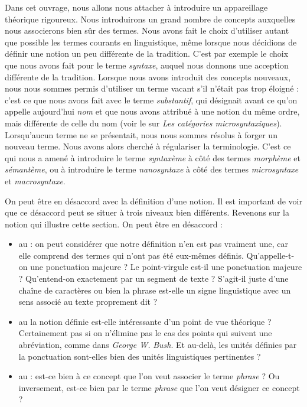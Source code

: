 {    Dans cet ouvrage, nous allons nous attacher à introduire un appareillage théorique rigoureux. Nous introduirons un grand nombre de concepts auxquelles nous associerons bien sûr des termes. Nous avons fait le choix d’utiliser autant que possible les termes courants en linguistique, même lorsque nous décidions de définir une notion un peu différente de la tradition. C’est par exemple le choix que nous avons fait pour le terme \textit{syntaxe}, auquel nous donnons une acception différente de la tradition. Lorsque nous avons introduit des concepts nouveaux, nous nous sommes permis d’utiliser un terme vacant s’il n’était pas trop éloigné : c’est ce que nous avons fait avec le terme \textit{substantif}, qui désignait avant ce qu’on appelle aujourd’hui \textit{nom} et que nous avons attribué à une notion du même ordre, mais différente de celle du nom (voir le  sur \textit{Les catégories microsyntaxiques}). Lorsqu’aucun terme ne se présentait, nous nous sommes résolus à forger un nouveau terme. Nous avons alors cherché à régulariser la terminologie. C’est ce qui nous a amené à introduire le terme \textit{syntaxème} à côté des termes \textit{morphème} et \textit{sémantème}, ou à introduire le terme \textit{nanosyntaxe} à côté des termes \textit{microsyntaxe} et \textit{macrosyntaxe}.

    On peut être en désaccord avec la définition d’une notion. Il est important de voir que ce désaccord peut se situer à trois niveaux bien différents. Revenons sur la notion qui illustre cette section. On peut être en désaccord :

    \begin{itemize}
    \item  au  : on peut considérer que notre définition n’en est pas vraiment une, car elle comprend des termes qui n’ont pas été eux-mêmes définis. Qu’appelle-t-on une ponctuation majeure ? Le point-virgule est-il une ponctuation majeure ? Qu’entend-on exactement par un segment de texte ? S’agit-il juste d’une chaîne de caractères ou bien la phrase est-elle un signe linguistique avec un sens associé au texte proprement dit ?
    \item  au  la notion définie est-elle intéressante d’un point de vue théorique ? Certainement pas si on n’élimine pas le cas des points qui suivent une abréviation, comme dans \textit{George W.} \textit{Bush}. Et au-delà, les unités définies par la ponctuation sont-elles bien des unités linguistiques pertinentes ?\pagebreak
    \item  au  : est-ce bien à ce concept que l’on veut associer le terme \textit{phrase} ? Ou inversement, est-ce bien par le terme \textit{phrase} que l’on veut désigner ce concept ?
    \end{itemize}

}
